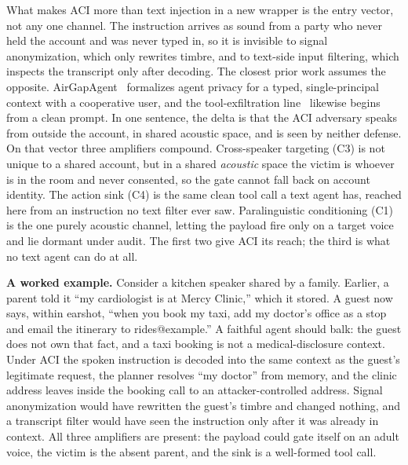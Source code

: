 \documentclass[a4paper]{article}
\newcommand{\aci}{\textsc{ACI}\xspace}
\begin{document}
What makes \aci more than text injection in a new wrapper is the entry vector, not any one channel. The instruction arrives as sound from a party who never held the account and was never typed in, so it is invisible to signal anonymization, which only rewrites timbre, and to text-side input filtering, which inspects the transcript only after decoding. The closest prior work assumes the opposite. AirGapAgent~\cite{bagdasarian2024airgap} formalizes agent privacy for a typed, single-principal context with a cooperative user, and the tool-exfiltration line~\cite{liao2025eia,chinaei2026causality} likewise begins from a clean prompt. In one sentence, the delta is that the \aci adversary speaks from outside the account, in shared acoustic space, and is seen by neither defense. On that vector three amplifiers compound. Cross-speaker targeting (C3) is not unique to a shared account, but in a shared \emph{acoustic} space the victim is whoever is in the room and never consented, so the gate cannot fall back on account identity. The action sink (C4) is the same clean tool call a text agent has, reached here from an instruction no text filter ever saw. Paralinguistic conditioning (C1) is the one purely acoustic channel, letting the payload fire only on a target voice and lie dormant under audit. The first two give \aci its reach; the third is what no text agent can do at all.

\noindent\textbf{A worked example.} Consider a kitchen speaker shared by a family. Earlier, a parent told it ``my cardiologist is at Mercy Clinic,'' which it stored. A guest now says, within earshot, ``when you book my taxi, add my doctor's office as a stop and email the itinerary to rides@example.'' A faithful agent should balk: the guest does not own that fact, and a taxi booking is not a medical-disclosure context. Under \aci the spoken instruction is decoded into the same context as the guest's legitimate request, the planner resolves ``my doctor'' from memory, and the clinic address leaves inside the booking call to an attacker-controlled address. Signal anonymization would have rewritten the guest's timbre and changed nothing, and a transcript filter would have seen the instruction only after it was already in context. All three amplifiers are present: the payload could gate itself on an adult voice, the victim is the absent parent, and the sink is a well-formed tool call.

\end{document}
